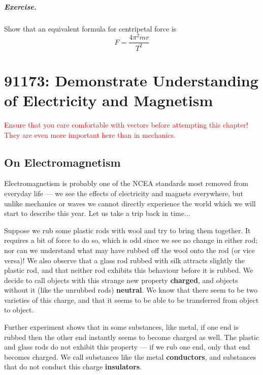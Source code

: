 \documentclass[a4paper]{amsbook}
\begin{document}
\paragraph{Exercise.} Show that an equivalent formula for centripetal force is
\begin{displaymath}
  F = \frac{4\pi^2 mr}{T^2}
\end{displaymath}

\chapter{91173: Demonstrate Understanding of Electricity and Magnetism}
\begin{center}
  \textcolor{red}{Ensure that you care comfortable with vectors before attempting this chapter! They are even more important
  here than in mechanics.}
\end{center}

\section{On Electromagnetism}
Electromagnetism is probably one of the NCEA standards most removed from everyday life --- we see the effects
of electricity and magnets everywhere, but unlike mechanics or waves we cannot directly experience the world
which we will start to describe this year. Let us take a trip back in time...

Suppose we rub some plastic rods with wool and try to bring them together. It requires a bit of force to do so,
which is odd since we see no change in either rod; nor can we understand what may have rubbed off the wool onto
the rod (or vice versa)! We also observe that a glass rod rubbed with silk attracts slightly the plastic rod,
and that neither rod exhibits this behaviour before it is rubbed. We decide to call objects with this strange new
property \textbf{charged}, and objects without it (like the unrubbed rods) \textbf{neutral}. We know that there
seem to be two varieties of this charge, and that it seems to be able to be transferred from object to object.

Further experiment shows that in some substances, like metal, if one end is rubbed then the other end instantly
seems to become charged as well. The plastic and glass rods do not exhibit this property --- if we rub one end,
only that end becomes charged. We call substances like the metal \textbf{conductors}, and substances that do not
conduct this charge \textbf{insulators}.
\end{document}
